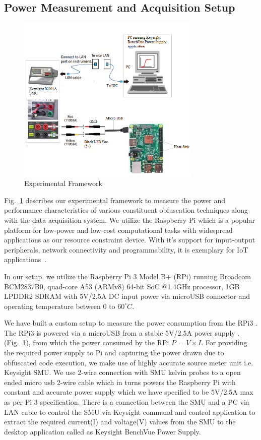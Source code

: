 \subsection{Power Measurement and Acquisition Setup}
\begin{figure}[t]
  \centering
\includegraphics[width=0.9\columnwidth, height=8cm]{expsetup}
  \caption{Experimental Framework}\label{expsetup}
\end{figure}
Fig.~\ref{expsetup} describes our experimental framework to measure the power and performance characteristics of various constituent obfuscation techniques along with the data acquisition system. We utilize the Raspberry Pi which is a popular platform for low-power and low-cost computational tasks with widespread applications as our resource constraint device. With it's support for input-output peripherals, network connectivity and programmability, it is exemplary for IoT applications~\cite{maksimovic2014raspberry}.

In our setup, we utilize the Raspberry Pi 3 Model B+ (RPi) running Broadcom BCM2837B0, quad-core A53 (ARMv8) 64-bit SoC @1.4GHz processor, 1GB LPDDR2 SDRAM with 5V/2.5A DC input power via microUSB connector and operating temperature between 0 to $60^{\circ}C$.


We have built a custom setup to measure the power consumption from the RPi3 . The RPi3 is powered via a microUSB from a stable 5V/2.5A power supply . (Fig.~\ref{expsetup}), from which the power consumed by the RPi $P$ = $V\times I$.
For providing the required power supply to Pi and capturing the power drawn due to obfuscated code execution, we make use of highly accurate source meter unit i.e. Keysight SMU. We use 2-wire connection with SMU kelvin probes to a open ended micro usb 2-wire cable which in turns powers the Raspberry Pi with constant and accurate power supply which we have specified to be 5V/2.5A max as per Pi 3 specification.
There is a connection between the SMU and a PC via LAN cable to control the SMU via Keysight command and control application to extract the required current(I) and voltage(V) values from the SMU to the desktop application called as Keysight BenchVue Power Supply. 

